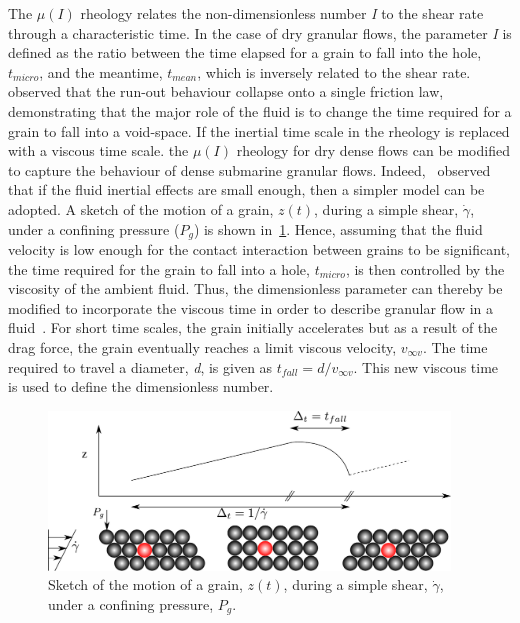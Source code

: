 The $\mu(\textit{I})$ rheology relates the non-dimensionless number \textit{I} 
to the shear rate through a characteristic time. In the case of dry granular 
flows, the parameter \textit{I} is defined as the ratio between the time 
elapsed for a grain to fall into the hole, $\textit{t}_{\textit{micro}}$, and 
the meantime, $\textit{t}_{\textit{mean}}$, which is inversely related to the 
shear rate.~\citet{Cassar2005} observed that the run-out behaviour collapse 
onto a single friction law, demonstrating that the major role of the fluid is 
to change the time required for a grain to fall into a void-space. If the 
inertial time scale in the rheology is replaced with a viscous time scale. the 
$\mu(\textit{I})$ rheology for dry dense flows can be modified to capture 
the behaviour of dense submarine granular flows. Indeed,~\citet{Pitman2005} 
observed that if the fluid inertial effects are small enough, then a simpler 
model can be adopted. A sketch of the motion of a grain, $z(t)$, during 
a simple shear, $\dot{\gamma}$, under a confining pressure ($P_g$) is 
shown in~\cref{fig:tmicro}. Hence, assuming that the fluid 
velocity is low enough for the contact interaction between grains to be 
significant, the time required for the grain to fall into a hole, 
$\textit{t}_{\textit{micro}}$, is  then controlled by the viscosity of the 
ambient fluid. Thus, the dimensionless parameter can thereby be modified to 
incorporate the viscous time in order to describe granular flow in a 
fluid~\citep{Pouliquen2005}. For short time scales, the grain initially 
accelerates but as a result of the drag 
force, the grain eventually reaches a limit viscous velocity, $v_{\infty v}$. 
The time required to travel a diameter, \textit{d}, is given as $t_{fall} = d / 
v_{\infty v}$. This new viscous time is used to define the dimensionless number.

\begin{figure}[htbp]
\centering
\includegraphics[width=0.95\textwidth]{tmicro}
\caption{Sketch of the motion of a grain, $z(t)$, during a simple shear, 
$\dot{\gamma}$, under a confining pressure, $P_g$.}
\label{fig:tmicro}
\end{figure}

